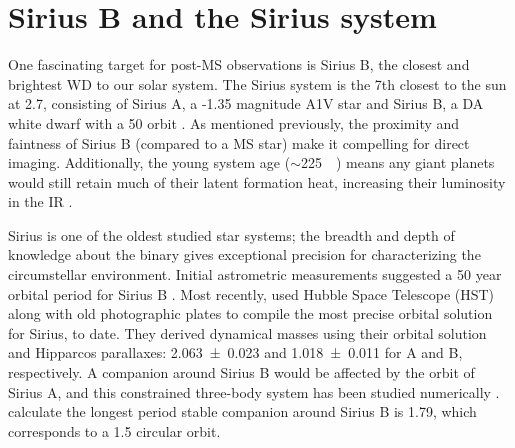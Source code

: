 \documentclass[twocolumn]{aastex631}
\begin{document}

\section{Sirius B and the Sirius system} \label{sec:sirius}

One fascinating target for post-MS observations is Sirius B, the closest and brightest WD to our solar system. The Sirius system is the 7th closest to the sun at \qty{2.7}{\parsec}, consisting of Sirius A, a -1.35 magnitude A1V star and Sirius B, a DA white dwarf with a \qty{50}{\year} orbit \citep{collaborationGaiaMission2016, bondSiriusSystemIts2017,collaborationGaiaEarlyData2021a}. As mentioned previously, the proximity and faintness of Sirius B (compared to a MS star) make it compelling for direct imaging. Additionally, the young system age ($\sim$\qty{225}{\mega\year}) means any giant planets would still retain much of their latent formation heat, increasing their luminosity in the IR \citep{fortneyGiantPlanetInterior2010}.

Sirius is one of the oldest studied star systems; the breadth and depth of knowledge about the binary gives exceptional precision for characterizing the circumstellar environment. Initial astrometric measurements suggested a 50 year orbital period for Sirius B \citep{auwersOrbitSirius1864}. Most recently, \citet{bondSiriusSystemIts2017} used Hubble Space Telescope (HST) along with old photographic plates to compile the most precise orbital solution for Sirius, to date. They derived dynamical masses using their orbital solution and Hipparcos parallaxes: \qty{2.063+-0.023}{\solarmass} and \qty{1.018+-0.011}{\solarmass} for A and B, respectively. A companion around Sirius B would be affected by the orbit of Sirius A, and this constrained three-body system has been studied numerically \citep{holmanLongTermStabilityPlanets1999}. \citet{bondSiriusSystemIts2017} calculate the longest period stable companion around Sirius B is \qty{1.79}{\year}, which corresponds to a \qty{1.5}{\au} circular orbit.
\end{document}
